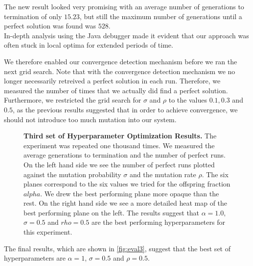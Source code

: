 The new result looked very promising with an average number of generations to termination of only $15.23$, but still the maximum number of generations until a perfect solution was found was $528$.\\
In-depth analysis using the Java debugger made it evident that our approach was often stuck in local optima for extended periods of time.

We therefore enabled our convergence detection mechanism before we ran the next grid search.
Note that with the convergence detection mechanism we no longer necessarily retreived a perfect solution in each run.
Therefore, we measured the number of times that we actually did find a perfect solution.
Furthermore, we restricted the grid search for $\sigma$ and $\rho$ to the values $0.1, 0.3$ and $0.5$, as the previous results suggested that in order to achieve convergence, we should not introduce too much mutation into our system.

\begin{figure}[!tb]
\centering

\caption[Third set of Hyperparameter Optimization Results]{\textbf{Third set of Hyperparameter Optimization Results.} The experiment was repeated one thousand times. We measured the average generations to termination and the number of perfect runs. On the left hand side we see the number of perfect runs plotted against the mutation probability $\sigma$ and the mutation rate $\rho$. The six planes correspond to the six values we tried for the offspring fraction $alpha$. We drew the best performing plane more opaque than the rest. On the right hand side we see a more detailed heat map of the best performing plane on the left. The results suggest that $\alpha=1.0$, $\sigma=0.5$ and $rho=0.5$ are the best performing hyperparameters for this experiment.}
\label{fig:eval3}  
\end{figure}

The final results, which are shown in \autoref{fig:eval3}, suggest that the best set of hyperparameters are $\alpha=1$, $\sigma=0.5$ and $\rho=0.5$.

